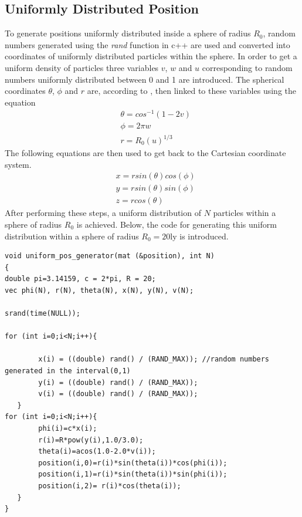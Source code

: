 \subsection{Uniformly Distributed Position}
To generate positions uniformly distributed inside a sphere of radius $R_0$, random numbers generated using the \textit{rand} function in c++ are used and converted into coordinates of uniformly distributed particles within the sphere. 
In order to get a uniform density of particles three variables $v$, $w$ and $u$ corresponding to random numbers uniformly distributed between 0 and 1 are introduced.
The spherical coordinates $\theta$, $\phi$ and $r$ are, according to \cite{AddNotesAstroUniDist}, then linked to these variables using the equation
\begin{align*}
	&\theta = cos^{-1}(1-2v)
	\\
	&\phi = 2\pi w
	\\	
	&r = R_0 (u)^{1/3}
\end{align*}                                            
The following equations are then used to get back to the Cartesian coordinate system.
\begin{align*}
	&x= rsin(\theta)cos(\phi)
	\\
    &y = r sin(\theta) sin(\phi)
    \\
    &z = r cos(\theta)
\end{align*}
After performing these steps, a uniform distribution of $N$ particles within a sphere of radius $R_0$ is achieved.
Below, the code for generating this uniform distribution within a sphere of radius $R_0 = 20 \text{ly}$ is introduced.
\begin{lstlisting}
void uniform_pos_generator(mat (&position), int N)
{
double pi=3.14159, c = 2*pi, R = 20;
vec phi(N), r(N), theta(N), x(N), y(N), v(N);

srand(time(NULL));

for (int i=0;i<N;i++){

        x(i) = ((double) rand() / (RAND_MAX)); //random numbers generated in the interval(0,1)
        y(i) = ((double) rand() / (RAND_MAX));
        v(i) = ((double) rand() / (RAND_MAX));
   }
for (int i=0;i<N;i++){
        phi(i)=c*x(i);
        r(i)=R*pow(y(i),1.0/3.0);
        theta(i)=acos(1.0-2.0*v(i));
        position(i,0)=r(i)*sin(theta(i))*cos(phi(i));
        position(i,1)=r(i)*sin(theta(i))*sin(phi(i));
        position(i,2)= r(i)*cos(theta(i));
   }
}
\end{lstlisting}
